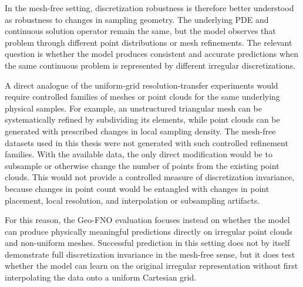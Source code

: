 In the mesh-free setting, discretization robustness is therefore better understood as robustness to changes in sampling geometry. The underlying PDE and continuous solution operator remain the same, but the model observes that problem through different point distributions or mesh refinements. The relevant question is whether the model produces consistent and accurate predictions when the same continuous problem is represented by different irregular discretizations.

A direct analogue of the uniform-grid resolution-transfer experiments would require controlled families of meshes or point clouds for the same underlying physical samples. For example, an unstructured triangular mesh can be systematically refined by subdividing its elements, while point clouds can be generated with prescribed changes in local sampling density. The mesh-free datasets used in this thesis were not generated with such controlled refinement families. With the available data, the only direct modification would be to subsample or otherwise change the number of points from the existing point clouds. This would not provide a controlled measure of discretization invariance, because changes in point count would be entangled with changes in point placement, local resolution, and interpolation or subsampling artifacts.

For this reason, the Geo-FNO evaluation focuses instead on whether the model can produce physically meaningful predictions directly on irregular point clouds and non-uniform meshes. Successful prediction in this setting does not by itself demonstrate full discretization invariance in the mesh-free sense, but it does test whether the model can learn on the original irregular representation without first interpolating the data onto a uniform Cartesian grid.




